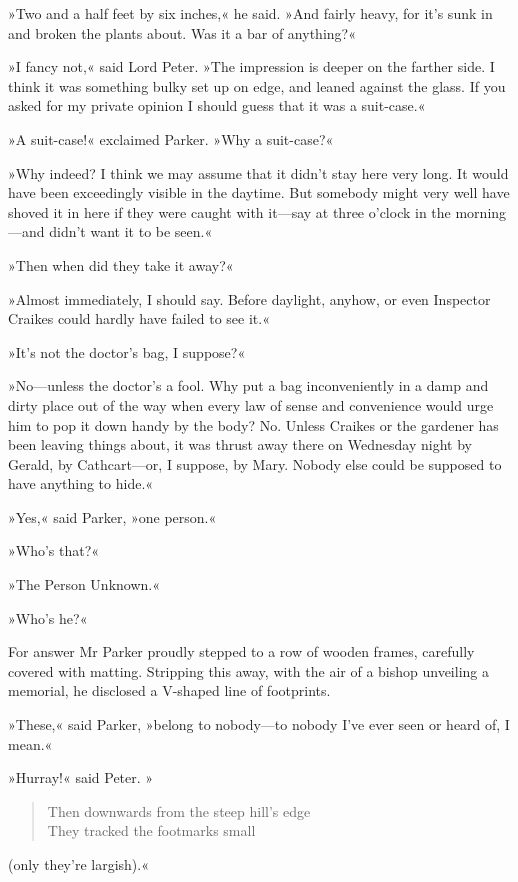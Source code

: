 »Two and a half feet by six inches,« he said. »And fairly heavy, for it's sunk in and broken the plants about. Was it a bar of anything?«

»I fancy not,« said Lord Peter. »The impression is deeper on the farther side. I think it was something bulky set up on edge, and leaned against the glass. If you asked for my private opinion I should guess that it was a suit-case.«

»A suit-case!« exclaimed Parker. »Why a suit-case?«

»Why indeed? I think we may assume that it didn't stay here very long. It would have been exceedingly visible in the daytime. But somebody might very well have shoved it in here if they were caught with it\allowbreak---\allowbreak say at three o'clock in the morning\allowbreak---\allowbreak and didn't want it to be seen.«

»Then when did they take it away?«

»Almost immediately, I should say. Before daylight, anyhow, or even Inspector Craikes could hardly have failed to see it.«

»It's not the doctor's bag, I suppose?«

»No\allowbreak---\allowbreak unless the doctor's a fool. Why put a bag inconveniently in a damp and dirty place out of the way when every law of sense and convenience would urge him to pop it down handy by the body? No. Unless Craikes or the gardener has been leaving things about, it was thrust away there on Wednesday night by Gerald, by Cathcart\allowbreak---\allowbreak or, I suppose, by Mary. Nobody else could be supposed to have anything to hide.«

»Yes,« said Parker, »one person.«

»Who's that?«

»The Person Unknown.«

»Who's he?«

For answer Mr Parker proudly stepped to a row of wooden frames, carefully covered with matting. Stripping this away, with the air of a bishop unveiling a memorial, he disclosed a V-shaped line of footprints.

»These,« said Parker, »belong to nobody\allowbreak---\allowbreak to nobody I've ever seen or heard of, I mean.«

»Hurray!« said Peter. »
\begin{verse}
Then downwards from the steep hill's edge\\
They tracked the footmarks small
\end{verse}
(only they're largish).«

